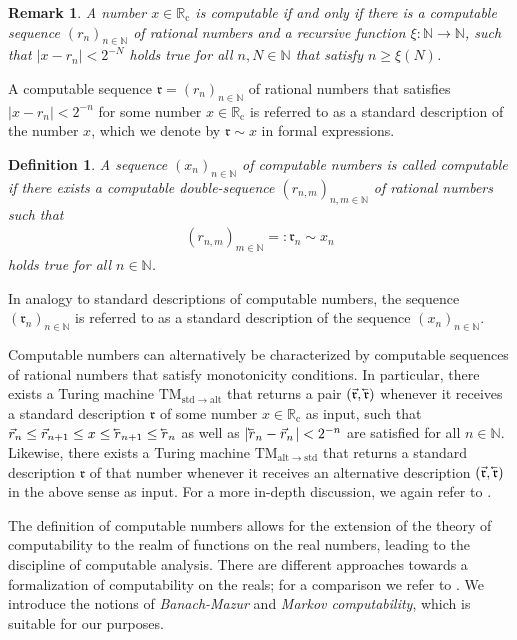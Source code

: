 \documentclass[conference]{IEEEtran}
\def\NN{{\mathbb N}}
\def\RR{{\mathbb R}}
\newcommand{\RRc}{\RR_{\mathrm{c}}}
\newcommand{\TM}{\mathrm{TM}}
\newcommand{\cev}[1]{\reflectbox{\ensuremath{\vec{\reflectbox{\ensuremath{#1}}}}}}
\newtheorem{Definition}[Theorem]{Definition}
\newtheorem{Remark}[Theorem]{Remark}
\begin{document}
	\begin{Remark}  A number \(x\in\RRc\) is computable if and only if there is a computable sequence \((r_n)_{n\in\NN}\) 
					of rational numbers and a recursive function \(\xi:\NN\to\NN\), such that \(|x-r_n|< 2^{-N}\)
					holds true for all \(n,N\in\NN\) that satisfy \(n \geq \xi(N)\). 
	\end{Remark}

	\noindent A computable sequence \(\mathfrak{r} = (r_n)_{n\in\NN}\) of rational numbers that satisfies \(|x-r_n|<2^{-n}\) for some number \(x\in\RRc\) 
	is referred to as a standard description of the number \(x\), which we denote by \(\mathfrak{r}\sim x\) in formal expressions. 
	
	\begin{Definition}	A sequence \((x_n)_{n\in\NN}\) of computable numbers is called computable if there exists a computable double-sequence
						\((r_{n,m})_{n,m\in\NN}\) of rational numbers such that 
						\begin{align} (r_{n,m})_{m\in\NN} =: \mathfrak{r}_n \sim x_n
						\end{align}
						holds true for all \(n\in\NN\).
	\end{Definition}
	
	In analogy to standard descriptions of computable numbers, the sequence \((\mathfrak{r}_n)_{n\in\NN}\) is referred to as a standard description
	of the sequence \((x_n)_{n\in\NN}\).

	Computable numbers can alternatively be characterized by computable sequences of rational numbers that satisfy monotonicity conditions. 
	In particular, there exists a Turing machine \(\TM_{\mathrm{std}\rightarrow\mathrm{alt}}\) that returns a pair \((\vec{\mathfrak{r}}, \cev{\mathfrak{r}})\) 
	whenever it receives a standard description \(\mathfrak{r}\) of some number \(x\in\RRc\) as input, such that
	\(	\vec{r}_n \leq \vec{r}_{n+1} \leq x \leq \cev{r}_{n+1} \leq \cev{r}_n
	\)
	as well as 
	\(	| \cev{r}_n - \vec{r}_n\hspace{1pt}| < 2^{-n}
	\)
	are satisfied for all \(n\in\NN\). Likewise, there exists a Turing machine \(\TM_{\mathrm{alt}\rightarrow\mathrm{std}}\) that returns a standard description 
	\(\mathfrak{r}\) of that number whenever it receives an alternative description \((\vec{\mathfrak{r}}, \cev{\mathfrak{r}})\) in the above sense as input. 
	For a more in-depth discussion, we again refer to \cite{PoRi17}. %

	The definition of computable numbers allows for the extension of the theory of computability to the realm of functions on the real numbers, 
	leading to the discipline of computable analysis. There are different approaches towards a formalization of computability on the reals; for a comparison 
	we refer to \cite{AB14}. We introduce the notions of \emph{Banach-Mazur} and \emph{Markov computability}, which is suitable for our purposes. 
\end{document}
